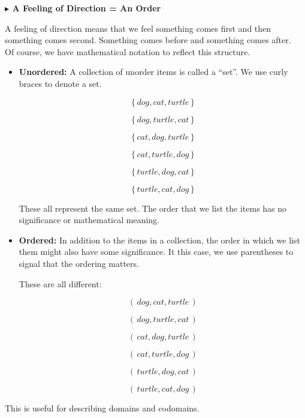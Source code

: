 \documentclass{ximera}
\begin{document}
\textbf{\textcolor{red!80!black}{$\blacktriangleright$ A Feeling of Direction = An Order}}

A feeling of direction means that we feel something comes first and then something comes second.  Something comes before and something comes after. \\


Of course, we have mathematical notation to reflect this structure. \\


\begin{itemize}
\item \textbf{\textcolor{blue!55!black}{Unordered:}}  A collection of unorder items is called a ``set''.  We use curly braces to denote a set.

\[
\{ \, dog, cat, turtle \, \}
\]

\[
\{ \, dog, turtle, cat \, \}
\]

\[
\{ \, cat, dog, turtle \, \}
\]

\[
\{ \, cat, turtle, dog \, \}
\]

\[
\{ \, turtle, dog, cat \, \}
\]

\[
\{ \, turtle, cat, dog \, \}
\]

These all represent the same set.  The order that we list the items has no significance or mathematical meaning.


\item \textbf{\textcolor{blue!55!black}{Ordered:}} In addition to the items in a collection, the order in which we list them might also have some significance.  It this case, we use parentheses to signal that the ordering matters.


These are all different:

\[
( \, dog, cat, turtle \, )
\]

\[
( \, dog, turtle, cat \, )
\]

\[
( \, cat, dog, turtle \, )
\]

\[
( \, cat, turtle, dog \, )
\]

\[
( \, turtle, dog, cat \, )
\]

\[
( \, turtle, cat, dog \, )
\]


\end{itemize}


This is useful for describing domains and codomains.  \\
\end{document}
